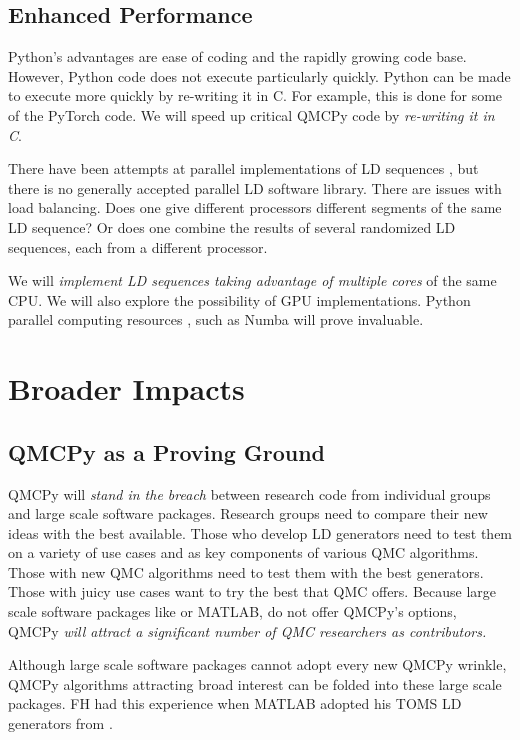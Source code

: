 \documentclass[11pt]{NSFamsart}
\begin{document}
\subsection{Enhanced Performance}
Python's advantages are ease of coding and the rapidly growing code base.  However, Python code does not execute particularly quickly.  Python can be made to execute more quickly by re-writing it in C.  For example, this is done for some of the PyTorch code.  We will speed up critical QMCPy code by \emph{re-writing it in C}.

There have been attempts at parallel implementations of LD sequences \cite{LiMul00a,OktSri02, SchUhl01,WanEtal06a,LiuHic04a}, but there is no generally accepted parallel LD software library.  There are issues with load balancing.  Does one give different processors different segments of the same LD sequence?  Or does one combine the results of several randomized LD sequences, each from a different processor.

We will \emph{implement LD sequences taking advantage of multiple cores} of the same CPU.  We will also explore the possibility of GPU implementations.  Python parallel computing resources \cite{ParallelPython}, such as Numba \cite{Numba} will prove invaluable.



\section{Broader Impacts}
\subsection{QMCPy as a Proving Ground}
QMCPy will \emph{stand in the breach} between research code from individual groups and large scale software packages.  Research groups need to compare their new ideas with the best available.  Those who develop LD generators need to test them on a variety of use cases and as key components of various QMC algorithms.  Those with new QMC algorithms need to test them with the best generators.  Those with juicy use cases want to try the best that QMC offers.  Because large scale software packages like  or MATLAB, do not offer QMCPy's options,  QMCPy \emph{will attract a significant number of QMC researchers as contributors.}

Although large scale software packages cannot adopt every new QMCPy wrinkle, QMCPy algorithms attracting broad interest can be folded into these large scale packages.  FH had this experience when MATLAB adopted his TOMS LD generators from \cite{HonHic00a}.
\end{document}
